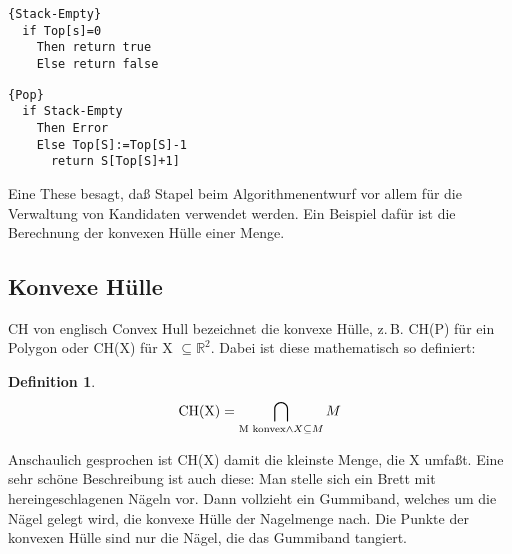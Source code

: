\documentclass[ngerman,draft,parskip=half*,twoside]{scrreprt}
\theoremstyle{break}
\newtheorem{definition}{Definition}[chapter]
\theoremstyle{nonumberbreak}
\newcommand*{\R}{\mathbb{R}}        %
\begin{document}
\begin{Algorithmus}[H]
\begin{lstlisting}[frame=tlrb, mathescape=true, title=\textsc{Stack-Empty}, gobble=1]{Stack-Empty}
  if Top[s]=0 
    Then return true
    Else return false
\end{lstlisting}
\end{Algorithmus}

\begin{Algorithmus}[H]
\begin{lstlisting}[frame=tlrb, mathescape=true, title=\textsc{Pop}, gobble=1]{Pop}
  if Stack-Empty
    Then Error
    Else Top[S]:=Top[S]-1
      return S[Top[S]+1]
\end{lstlisting}
\end{Algorithmus}

Eine These besagt, daß Stapel beim Algorithmenentwurf vor allem für die Verwaltung von Kandidaten verwendet werden. Ein Beispiel
dafür ist die Berechnung der konvexen Hülle einer Menge.

\subsection{Konvexe Hülle}
CH von englisch Convex Hull bezeichnet die konvexe Hülle, z.\,B. CH(P) für ein Polygon oder CH(X) für X $\subseteq \R^2$. Dabei
ist diese mathematisch so definiert:
\begin{definition}
\[\mbox{CH(X)}=\bigcap_{\textnormal{M konvex}\wedge X \subseteq M} M\]
\end{definition}
Anschaulich gesprochen ist CH(X) damit die kleinste Menge, die X umfaßt. Eine sehr schöne Beschreibung ist auch diese: Man stelle sich
ein Brett mit hereingeschlagenen Nägeln vor. Dann vollzieht ein Gummiband, welches um die Nägel gelegt wird, die konvexe Hülle der
Nagelmenge nach. Die Punkte der konvexen Hülle sind nur die Nägel, die das Gummiband tangiert. 
\end{document}
